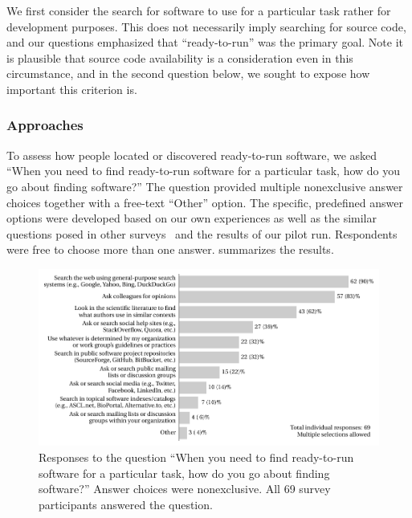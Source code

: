 \documentclass{casicswhitepaper}
\newcommand{\totalrespondents}{69\xspace}
\begin{document}
We first consider the search for software to use for a particular task rather for development purposes. This does not necessarily imply searching for source code, and our questions emphasized that ``ready-to-run'' was the primary goal.  Note it is plausible that source code availability is a consideration even in this circumstance, and in the second question below, we sought to expose how important this criterion is.

 
\subsubsection{Approaches}

To assess how people located or discovered ready-to-run software, we  asked ``When you need to find ready-to-run software for a particular task, how do you go about finding software?''  The question provided multiple nonexclusive answer choices together with a free-text ``Other'' option.  The specific, predefined answer options were developed based on our own experiences as well as the similar questions posed in other surveys~\cite{sim_2011, bajrachary_2009, linstead_2009} and the results of our pilot run.  Respondents were free to choose more than one answer.   summarizes the results.

\begin{figure}[htb]
  \centering
  \includegraphics[trim=0.1in 0.1in 0 0,width=6in]{files/plots/how-find-ready-to-run.pdf}
  \vspace*{-4ex}
  \caption{Responses to the question ``When you need to find ready-to-run software for a particular task, how do you go about finding software?'' Answer choices were nonexclusive. All \totalrespondents survey participants answered the question.}
  \label{how-find-ready-to-run}
\end{figure}
\end{document}

